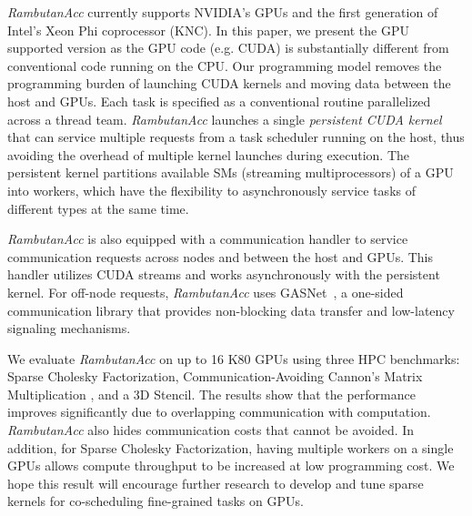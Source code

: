 {\em RambutanAcc} currently supports NVIDIA's GPUs and the first generation of Intel's Xeon Phi coprocessor (KNC).
In this paper, we present the GPU supported version as the GPU code (e.g. CUDA) is substantially different from conventional code running on the CPU.
Our programming model removes the programming burden of launching CUDA kernels and moving data between the host and GPUs.
Each task is specified as a conventional routine parallelized across a thread team.
{\em RambutanAcc} launches a single {\em persistent CUDA kernel} that can service multiple requests from a task scheduler running on the host, thus avoiding the overhead of multiple kernel launches during execution.
The persistent kernel partitions available SMs (streaming multiprocessors) of a GPU into workers, which have the flexibility to asynchronously service tasks of different types at the same time.

{\em RambutanAcc} is also equipped with a communication handler to service communication requests across nodes and between the host and GPUs.
This handler utilizes CUDA streams and works asynchronously with the persistent kernel.
For off-node requests, {\em RambutanAcc} uses GASNet~\cite{Bonachea:2002:gasnet}, a one-sided communication library %
that provides non-blocking data transfer and low-latency signaling mechanisms. %

We evaluate {\em RambutanAcc} on up to 16 K80 GPUs using three HPC benchmarks: Sparse Cholesky Factorization, Communication-Avoiding Cannon's Matrix Multiplication \cite{25Dcannon}, and a 3D Stencil.
The results show that the performance improves significantly due to overlapping communication with computation.
{\em RambutanAcc} also hides communication costs that cannot be avoided.
In addition, for Sparse Cholesky Factorization, having multiple workers on a single GPUs allows compute throughput to be increased at low programming cost. 
We hope this result will encourage further research to develop and tune sparse kernels for co-scheduling fine-grained tasks on GPUs.

